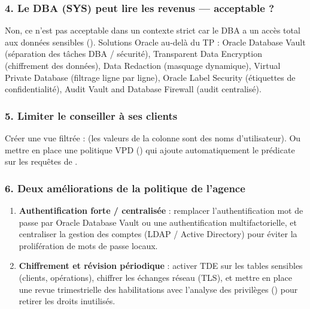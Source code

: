 \subsubsection{4. Le DBA (SYS) peut lire les revenus — acceptable ?}
Non, ce n'est pas acceptable dans un contexte strict car le DBA a un accès total aux
données sensibles (). Solutions Oracle au-delà du TP :
Oracle Database Vault (séparation des tâches DBA / sécurité), Transparent Data
Encryption (chiffrement des données), Data Redaction (masquage dynamique), Virtual
Private Database (filtrage ligne par ligne), Oracle Label Security (étiquettes de
confidentialité), Audit Vault and Database Firewall (audit centralisé).

\subsubsection{5. Limiter le conseiller à ses clients}
Créer une vue filtrée :
 (les valeurs de la colonne
 sont des noms d'utilisateur). Ou mettre en place une politique VPD
() qui ajoute automatiquement le prédicate
 sur les requêtes de
.

\subsubsection{6. Deux améliorations de la politique de l'agence}
\begin{enumerate}
  \item \textbf{Authentification forte / centralisée} : remplacer l'authentification
        mot de passe par Oracle Database Vault ou une authentification multifactorielle,
        et centraliser la gestion des comptes (LDAP / Active Directory) pour éviter la
        prolifération de mots de passe locaux.
  \item \textbf{Chiffrement et révision périodique} : activer TDE sur les tables
        sensibles (clients, opérations), chiffrer les échanges réseau (TLS), et mettre en
        place une revue trimestrielle des habilitations avec l'analyse des privilèges
        () pour retirer les droits inutilisés.
\end{enumerate}
